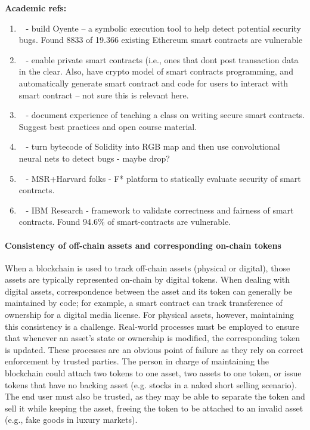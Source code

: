 \noindent
\textbf{Academic refs:}
\begin{enumerate}
\item~\cite{CCS:LCOSH16} - build Oyente -- a symbolic execution tool to help detect potential security bugs.  Found 8833 of 19.366 existing Ethereum smart contracts are vulnerable
\item~\cite{SP:KMSWP16} - enable private smart contracts (i.e., ones that dont post transaction data in the clear.  Also, have crypto model of smart contracts programming, and automatically generate smart contract and code for users to interact with smart contract -- not sure this is relevant here.
\item~\cite{FC:DAKMS16} - document experience of teaching a class on writing secure smart contracts.  Suggest best practices and open course material.
\item~\cite{arxiv:Huang18} - turn bytecode of Solidity into RGB map and then use convolutional neural nets to detect bugs - maybe drop?
\item~\cite{CCS:BDFGGK+16} - MSR+Harvard folks - F* platform to statically evaluate security of smart contracts.
\item~\cite{NDSS:KGDS18} - IBM Research - framework to validate correctness and fairness of smart contracts.  Found 94.6\% of smart-contracts are vulnerable.
\end{enumerate}

\paragraph{Consistency of off-chain assets and corresponding on-chain tokens}
When a blockchain is used to track off-chain assets (physical or digital), those assets are typically represented on-chain by digital tokens. When dealing with digital assets, correspondence between the asset and its token can generally be maintained by code; for example, a smart contract can track transference of ownership for a digital media license. For physical assets, however, maintaining this consistency is a challenge. Real-world processes must be employed to ensure that whenever an asset's state or ownership is modified, the corresponding token is updated. These processes are an obvious point of failure as they rely on correct enforcement by trusted parties. The person in charge of maintaining the blockchain could attach two tokens to one asset, two assets to one token, or issue tokens that have no backing asset (e.g. stocks in a naked short selling scenario). The end user must also be trusted, as they may be able to separate the token and sell it while keeping the asset, freeing the token to be attached to an invalid asset (e.g., fake goods in luxury markets). 

